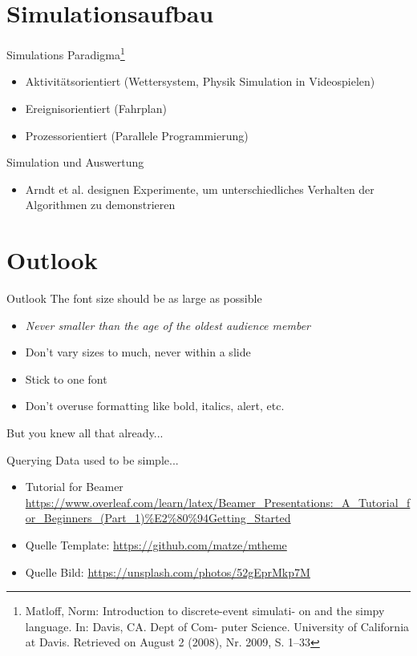 \documentclass[aspectratio=169,10pt]{beamer}
\begin{document}
\section{Simulationsaufbau}

\begin{frame}[t, fragile]{Simulations Paradigma\footnote{Matloff, Norm: Introduction to discrete-event simulati-
		on and the simpy language. In: Davis, CA. Dept of Com-
		puter Science. University of California at Davis. Retrieved on
		August 2 (2008), Nr. 2009, S. 1–33}}
	\begin{itemize}
		\item Aktivit\"atsorientiert (Wettersystem, Physik Simulation in Videospielen)
		\item \alert{Ereignisorientiert} (Fahrplan)
		\item Prozessorientiert (Parallele Programmierung)
	\end{itemize}
\end{frame}

\begin{frame}[t, fragile]{Simulation und Auswertung}
	\begin{itemize}
		\item Arndt et al. \alert{designen Experimente}, um unterschiedliches Verhalten der Algorithmen zu demonstrieren
	\end{itemize}
\end{frame}
\section{Outlook}
\begin{frame}{Outlook}
\Large
The font size should be as large as possible
\begin{itemize}
\item \textit{Never smaller than the age of the oldest audience member}
\item Don't vary sizes to much, never within a slide
\item Stick to one font
\item Don't overuse formatting like bold, italics, alert, etc.
\end{itemize}
But you knew all that already...
\end{frame}

\begin{frame}[t,fragile]{Querying Data used to be simple...}
\begin{itemize}
	\item Tutorial for Beamer \url{https://www.overleaf.com/learn/latex/Beamer_Presentations:_A_Tutorial_for_Beginners_(Part_1)%E2%80%94Getting_Started}
		\item Quelle Template: \url{https://github.com/matze/mtheme}
		\item Quelle Bild: \url{https://unsplash.com/photos/52gEprMkp7M}
	\end{itemize}
\end{frame}
\end{document}
